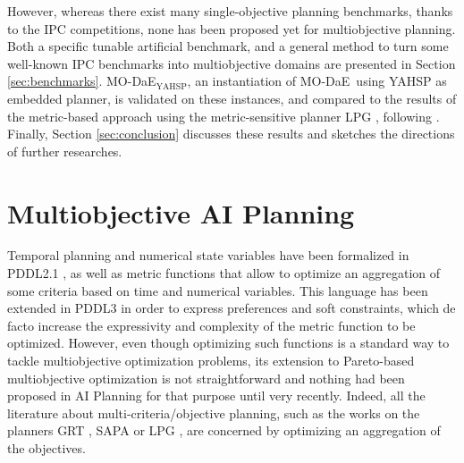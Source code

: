 \documentclass{article}
\def\DAE{{\sc DaE}}
\def\MODAE{{\sc MO-DaE}}
\newcommand{\MODAEYAHSP}{{\sc MO-DaE$_{\text{YAHSP}}$}}
\begin{document}

However, whereas there exist many single-objective planning benchmarks, thanks to the IPC competitions, none has been proposed yet for multiobjective planning. Both a specific tunable artificial benchmark, and a general method to turn some well-known IPC benchmarks into multiobjective domains are presented in Section \ref{sec:benchmarks}.  \MODAEYAHSP, an instantiation of \MODAE\ using YAHSP \cite{Vidal2004} as embedded planner, is validated on these instances, and compared to the results of 
the metric-based approach using the metric-sensitive planner LPG \cite{gerevini2008}, following \cite{LPG-PlanSIG2012}. Finally, Section \ref{sec:conclusion} discusses these results and sketches the directions of further researches.

\section{Multiobjective AI Planning}
\label{sec:multi-planning}

Temporal planning and numerical state variables have been formalized in PDDL2.1 \cite{PDDL2}, as well as metric functions that allow to optimize an aggregation of some criteria based on time and numerical variables. This language has been extended  in PDDL3 \cite{gerevini2006preferences} in order to express preferences and soft constraints, which de facto increase the expressivity and complexity of the metric function to be optimized. However, even though optimizing such functions is a standard way to tackle multiobjective optimization problems, its extension to Pareto-based multiobjective optimization is not straightforward and nothing had been proposed in AI Planning for that purpose until very recently. Indeed, all the literature about multi-criteria/objective planning, such as the works on the planners GRT \cite{Refanidis03}, SAPA \cite{Do2003sapa} or LPG \cite{gerevini2008}, are concerned by optimizing an aggregation of the objectives.
\end{document}
